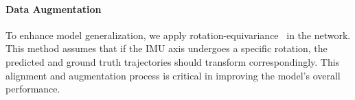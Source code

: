 \paragraph{Data Augmentation}
To enhance model generalization, we apply rotation-equivariance~\cite{cao2022rio} in the network. This method assumes that if the IMU axis undergoes a specific rotation, the predicted and ground truth trajectories should transform correspondingly. This alignment and augmentation process is critical in improving the model’s overall performance.







